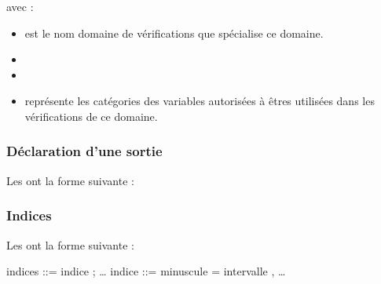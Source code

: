 \documentclass[letterpaper,10pt,french]{sphinxmanual}
\begin{document}
\sphinxAtStartPar
avec :
\begin{itemize}
\item {} 
\sphinxAtStartPar
{} est le nom domaine de vérifications que spécialise ce domaine.

\item {} 
\sphinxAtStartPar
{}

\item {} 
\sphinxAtStartPar
{}

\item {} 
\sphinxAtStartPar
{} représente les catégories des variables autorisées à êtres utilisées dans les vérifications de ce domaine.

\end{itemize}


\subsubsection{Déclaration d’une sortie}
\label{\detokenize{syntax:declaration-d-une-sortie}}
\sphinxAtStartPar
Les  ont la forme suivante :

\begin{sphinxVerbatim}[commandchars=\\\{\}]
    
\end{sphinxVerbatim}


\subsubsection{Indices}
\label{\detokenize{syntax:indices}}
\sphinxAtStartPar
Les  ont la forme suivante :

\begin{sphinxVerbatim}[commandchars=\\\{\}]
\PYGZlt{}indices\PYGZgt{} ::= \PYGZlt{}indice\PYGZgt{} ; …
\PYGZlt{}indice\PYGZgt{} ::= \PYGZlt{}minuscule\PYGZgt{} = \PYGZlt{}intervalle\PYGZgt{} , …
\end{sphinxVerbatim}
\end{document}
